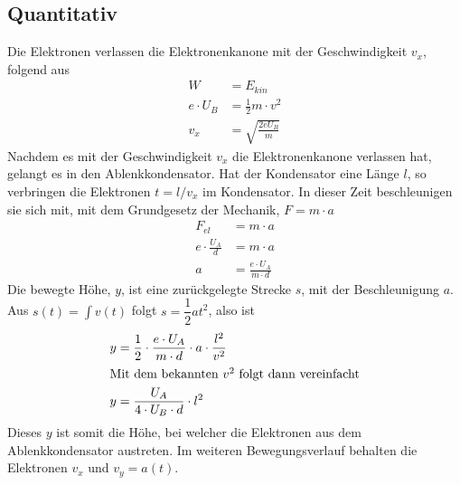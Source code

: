 \documentclass{article}
\begin{document}
\subsection{Quantitativ} 
Die Elektronen verlassen die Elektronenkanone mit der Geschwindigkeit $v_x$, folgend aus
\begin{align*}
 W &= E_{kin} \\
 e \cdot U_B &= \frac{1}{2} m \cdot v^2 \\
 v_x &= \sqrt{\frac{2 eU_B}{m}}
\end{align*}
Nachdem es mit der Geschwindigkeit $v_x$ die Elektronenkanone verlassen hat, gelangt es in den Ablenkkondensator. Hat der Kondensator eine Länge $l$, so verbringen die Elektronen $t=l/v_x$ im Kondensator. In dieser Zeit beschleunigen sie sich mit, mit dem Grundgesetz der Mechanik, $F= m \cdot a$
\begin{align*}
 F_{el} &= m \cdot a \\ 
 e \cdot \frac{U_A}{d} &= m \cdot a \\ 
 a &= \frac{e \cdot U_A}{m \cdot d} 
\end{align*}
Die bewegte Höhe, $y$, ist eine zurückgelegte Strecke $s$, mit der Beschleunigung $a$. Aus $\displaystyle {s(t) = \int v(t)}$ folgt ${s = \dfrac{1}{2}at^2}$, also ist
\begin{align*} 
 y &= \frac{1}{2} \cdot \frac{e \cdot U_A}{m \cdot d} \cdot a \cdot \frac{l^2}{v^2} \\
\intertext{Mit dem bekannten $v^2$ folgt dann vereinfacht} 
 y &= \frac{U_A}{4 \cdot U_B \cdot d} \cdot l^2
\end{align*}
Dieses $y$ ist somit die Höhe, bei welcher die Elektronen aus dem Ablenkkondensator austreten. Im weiteren Bewegungsverlauf behalten die Elektronen $v_x$ und $v_y = a(t)$.
 
 
\end{document}
